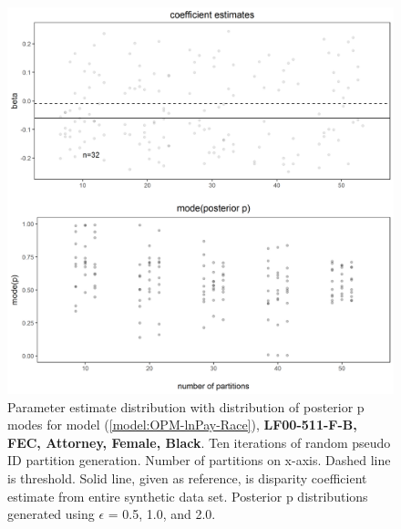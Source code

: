 \documentclass[10pt, letterpaper]{article}
\begin{document}
\begin{spacing}{1.0}
\begin{figure}[]
    \centering
    \includegraphics[width=6in]{images/RacePayDifferentialBetaWithPosteriorDistribution-LF00-905-F-B.png}
    \caption{Parameter estimate distribution with distribution of posterior p modes for model (\ref{model:OPM-lnPay-Race}), \textbf{LF00-511-F-B, FEC, Attorney, Female, Black}.  Ten iterations of random pseudo ID partition generation.  Number of partitions on x-axis.  Dashed line is threshold.  Solid line, given as reference, is disparity coefficient estimate from entire synthetic data set.  Posterior p distributions generated using $\epsilon$ = 0.5, 1.0, and 2.0.}
    \label{figure:RacePayDifferentialBetaWithPosteriorDistribution-LF00-905-F-B}
\end{figure}

\clearpage


\end{spacing}
\end{document}
